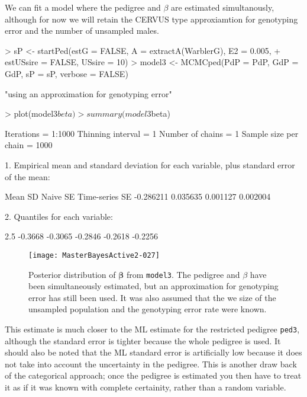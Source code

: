 \documentclass{article}
\begin{document}
  We can fit a model where the pedigree and $\beta$ are estimated simultanously, although for now we will retain the CERVUS type approxiamtion for genotyping error and the number of unsampled males.

\begin{Schunk}
\begin{Sinput}
> sP <- startPed(estG = FALSE, A = extractA(WarblerG), E2 = 0.005, 
+     estUSsire = FALSE, USsire = 10)
> model3 <- MCMCped(PdP = PdP, GdP = GdP, sP = sP, verbose = FALSE)
\end{Sinput}
\begin{Soutput}
[1] "using an approximation for genotyping error"
\end{Soutput}
\begin{Sinput}
> plot(model3$beta)
> summary(model3$beta)
\end{Sinput}
\begin{Soutput}
Iterations = 1:1000
Thinning interval = 1 
Number of chains = 1 
Sample size per chain = 1000 

1. Empirical mean and standard deviation for each variable,
   plus standard error of the mean:

          Mean             SD       Naive SE Time-series SE 
     -0.286211       0.035635       0.001127       0.002004 

2. Quantiles for each variable:

   2.5%     25%     50%     75%   97.5% 
-0.3668 -0.3065 -0.2846 -0.2618 -0.2256 
\end{Soutput}
\end{Schunk}
 


\begin{figure}[!h]
\begin{center}
\texttt{[image: MasterBayesActive2-027]}
\end{center}
\caption{Posterior distribution of $\bm{\beta}$ from \texttt{model3}. The pedigree and $\beta$ have been simultaneously estimated, but an approximation for genotyping error has still been used. It was also assumed that the we size of the unsampled population and the genotyping error rate were known.}
\label{model3beta-fig}
\end{figure}


This estimate is much closer to the ML estimate for the restricted pedigree \texttt{ped3}, although the standard error is tighter because the whole pedigree is used.  It should also be noted that the ML standard error is artificially low because it does not take into account the uncertainty in the pedigree.  This is another draw back of the categorical approach; once the pedigree is estimated you then have to treat it as if it was known with complete certainity, rather than a random variable. \\
\end{document}
